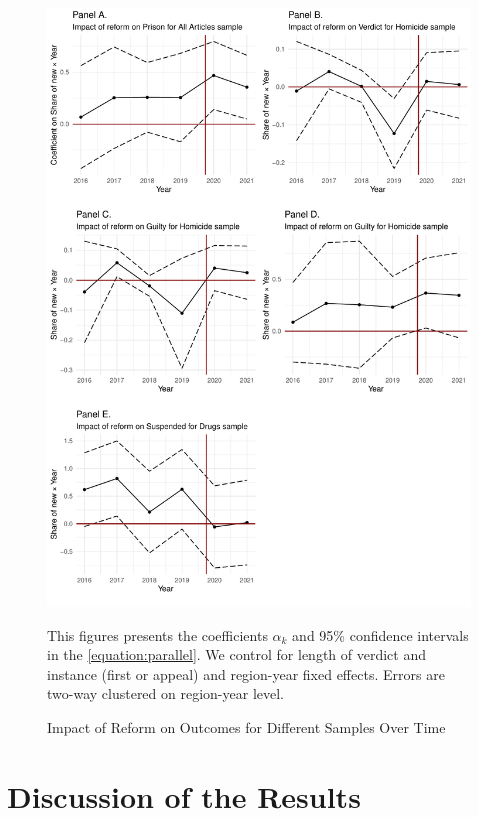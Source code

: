 \documentclass[12pt]{article}
\numberwithin{equation}{section}
\numberwithin{table}{section}
\numberwithin{figure}{section}
\begin{document}
\begin{figure}[!htbp]\centering
    \begin{minipage}{0.85\textwidth}
        \caption{Impact of Reform on Outcomes for Different Samples Over Time}
        \label{fig:pretrends}
        \includegraphics[width=\linewidth]{Rplot.pdf}
        {\begin{flushleft}\footnotesize This figures presents the coefficients $\alpha_k$ and 95\% confidence intervals in the \vref{equation:parallel}. We control for length of verdict and instance (first or appeal) and region-year fixed effects. Errors are two-way clustered on region-year level. \end{flushleft}}
        \end{minipage}
\end{figure}

\section{Discussion of the Results}
\end{document}
